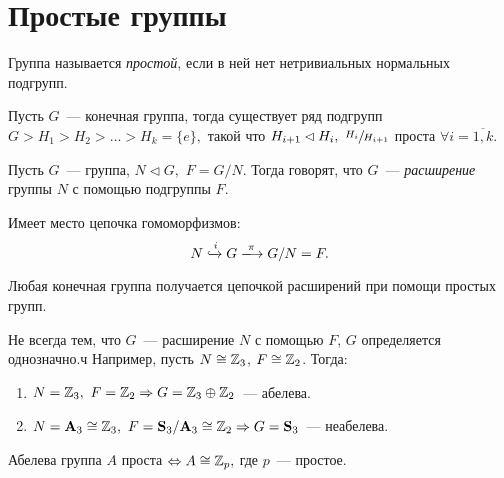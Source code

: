\newpage
        \section{Простые группы}
        \setcounter{definition}{0}
        \begin{definition}
            Группа называется \textit{простой}, если в ней нет нетривиальных нормальных подгрупп.
        \end{definition}
        \begin{theorem}
            Пусть $G$~--- конечная группа, тогда существует ряд подгрупп ${G > H_1 > H_2 > \ldots > H_k = \{e\},}$ такой что ${H_{i + 1} \lhd H_i, \ \sfrac{H_i}{H_{i+1}}}$ проста ${\forall i = \overline{1,k}.}$
        \end{theorem}
        \begin{definition}
            Пусть $G$~--- группа, ${N \lhd G,}$ ${F = G/N.}$ Тогда говорят, что $G$~--- \textit{расширение} группы $N$ с помощью подгруппы $F$.
        \end{definition}
        \begin{remark}
            Имеет место цепочка гомоморфизмов:
            \begin{equation*}
                N \xhookrightarrow{i} G \xlongrightarrow{\pi} G/N = F.
            \end{equation*}
        \end{remark}
        \begin{consequence*}
            Любая конечная группа получается цепочкой расширений при помощи простых групп.
        \end{consequence*}
        \begin{exmpls}
            Не всегда тем, что $G$~--- расширение $N$ с помощью $F$, $G$ определяется однозначно.ч Например, пусть ${N \cong \mathbb{Z}_3}$, ${F \cong \mathbb{Z}_2}$. Тогда: 
            \begin{enumerate}
            \setlength\itemsep{0.1em}
                \item ${N = \mathbb{Z}_3, \ F = \mathbb{Z}_2 \Rightarrow G = \mathbb{Z}_3 \oplus \mathbb{Z}_2}$~--- абелева.
                \item ${N = \mathbf{A}_3 \cong \mathbb{Z}_3, \ F = \mathbf{S}_3/\mathbf{A}_3 \cong \mathbb{Z}_2 \Rightarrow G = \mathbf{S}_3}$~--- неабелева.
            \end{enumerate}
        \end{exmpls}
        \begin{remark}
            Абелева группа $A$ проста ${\Leftrightarrow A \cong \mathbb{Z}_p,}$ где $p$~--- простое.
        \end{remark}
